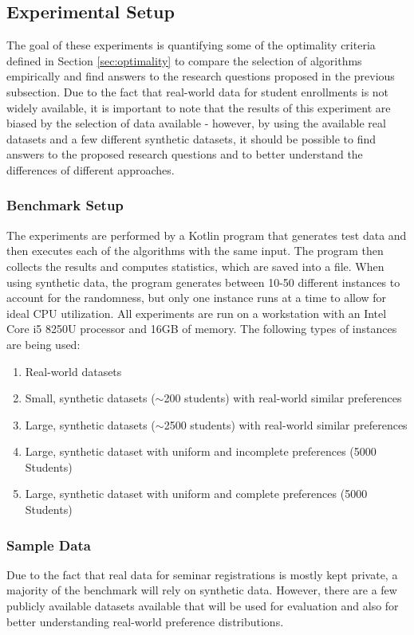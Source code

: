 \subsection{Experimental Setup}
The goal of these experiments is quantifying some of the optimality criteria defined in Section \ref{sec:optimality} to compare the selection of algorithms empirically and find answers to the research questions proposed in the previous subsection. Due to the fact that real-world data for student enrollments is not widely available, it is important to note that the results of this experiment are biased by the selection of data available - however, by using the available real datasets and a few different synthetic datasets, it should be possible to find answers to the proposed research questions and to better understand the differences of different approaches.

\subsubsection{Benchmark Setup}
The experiments are performed by a Kotlin program that generates test data and then executes each of the algorithms with the same input. The program then collects the results and computes statistics, which are saved into a file. When using synthetic data, the program generates between 10-50 different instances to account for the randomness, but only one instance runs at a time to allow for ideal CPU utilization. All experiments are run on a workstation with an Intel Core i5 8250U processor and 16GB of memory. The following types of instances are being used:
\begin{enumerate}
  \item Real-world datasets
  \item Small, synthetic datasets ($\sim$200 students) with real-world similar preferences
  \item Large, synthetic datasets ($\sim$2500 students) with real-world similar preferences
  \item Large, synthetic dataset with uniform and incomplete preferences (5000 Students)
  \item Large, synthetic dataset with uniform and complete preferences (5000 Students)
\end{enumerate}

\subsubsection{Sample Data}
Due to the fact that real data for seminar registrations is mostly kept private, a majority of the benchmark will rely on synthetic data. However, there are a few publicly available datasets available that will be used for evaluation and also for better understanding real-world preference distributions.

